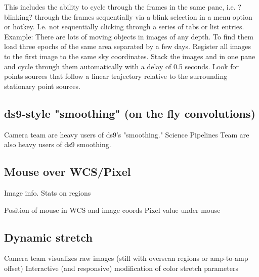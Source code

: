 \begin{itemize}
{This includes the ability to cycle through the frames in the same pane, i.e. ?blinking? through the frames sequentially via a blink selection in a menu option or hotkey.  I.e. not sequentially clicking through a series of tabs or list entries.
Example: There are lots of moving objects in images of any depth.  To find them load three epochs of the same area separated by a few days.  Register all images to the first image to the same sky coordinates.  Stack the images and in one pane and cycle through them automatically with a delay of 0.5 seconds.  Look for points sources that follow a linear trajectory relative to the surrounding stationary point sources.}
\end{itemize}

\subsection{ds9-style "smoothing" (on the fly convolutions)}
Camera team are heavy users of ds9's  "smoothing."
Science Pipelines Team are also heavy users of ds9 smoothing.

\subsection{Mouse over WCS/Pixel}

Image info. Stats on regions

Position of mouse in WCS and image coords
Pixel value under mouse


\subsection{Dynamic stretch}

Camera team visualizes raw images (still with overscan regions or amp-to-amp offset)
Interactive (and responsive) modification of color stretch parameters

